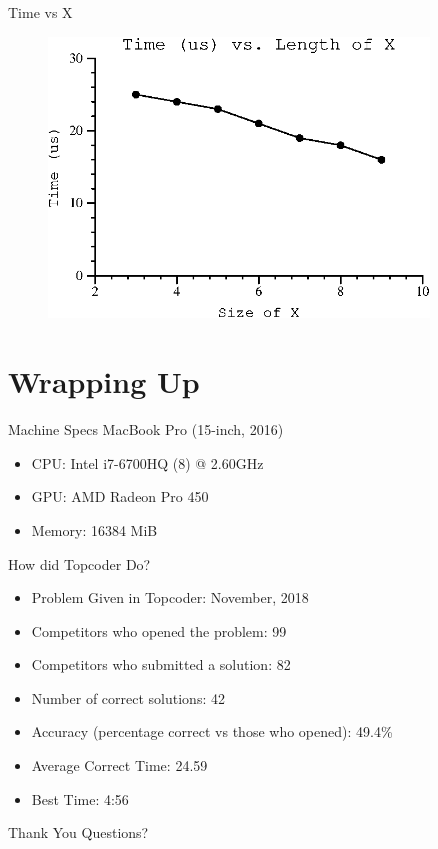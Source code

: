 \documentclass[10pt]{beamer}
\begin{document}
\begin{frame}{Time vs X}
  \begin{figure}[ht!]
    \centering
    \includegraphics[width=0.9\textwidth]{../figures/vary_x.ps}
  \end{figure}
\end{frame}

\section{Wrapping Up}

\begin{frame}{Machine Specs}
  \Large
  MacBook Pro (15-inch, 2016)
  \begin{itemize} %
    \item CPU\@: Intel i7\@-6700HQ (8) @ 2.60GHz
    \item GPU\@: AMD Radeon Pro 450
    \item Memory: 16384 MiB
  \end{itemize}

\end{frame}

\begin{frame}{How did Topcoder Do?}
  \large
  \begin{itemize}
    \item Problem Given in Topcoder: November, 2018
    \item Competitors who opened the problem: 99
    \item Competitors who submitted a solution: 82
    \item Number of correct solutions: 42
    \item Accuracy (percentage correct vs those who opened): 49.4\%
    \item Average Correct Time: 24.59
    \item Best Time: 4:56
  \end{itemize}
\end{frame}

\begin{frame}{Thank You}
  \Huge Questions?
\end{frame}
\end{document}
